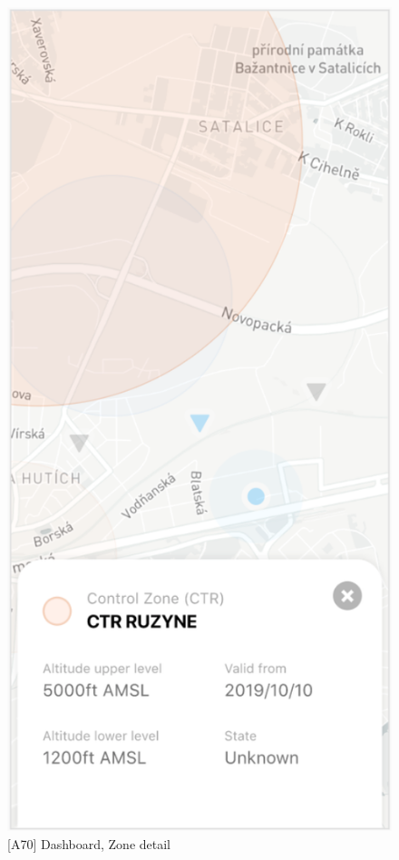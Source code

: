 \begin{figure}
\begin{minipage}{.45\textwidth}
        \includegraphics[width=.7\linewidth]{assets/user_interface_design/dashboard/dashboard_zone_detail.png}
        \caption{[A70] Dashboard, Zone detail}
        \label{fig:dashboard_zone_detail}
    \end{minipage}
    \label{fig:dashboard_zone_detail_all}
\end{figure}
